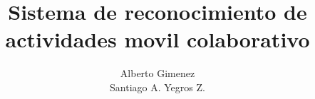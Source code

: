 \documentclass[final,fmstyle]{./util/ucathesis}
\title{Sistema de reconocimiento de actividades movil colaborativo}
\author{Alberto Gimenez \\ Santiago A. Yegros Z.}
\begin{document}
\maketitle     %




\tableofcontents	
\listoffigures
\listoftables
\listofalgorithms
%


\mainmatter  %



\appendix   %
%
%
\printbibliography
\end{document}
